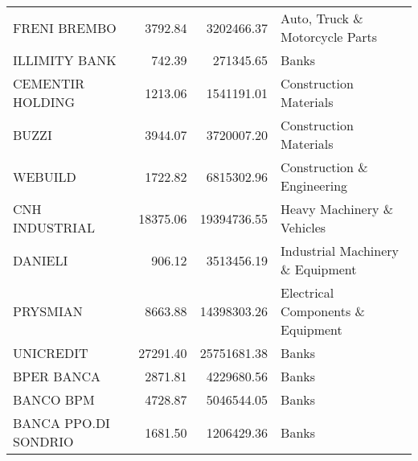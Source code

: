 \begin{tabular}{lrrl}
          FRENI BREMBO &     3792.84 &   3202466.37 &                     Auto, Truck \& Motorcycle Parts \\
         ILLIMITY BANK &      742.39 &    271345.65 &                                              Banks \\
      CEMENTIR HOLDING &     1213.06 &   1541191.01 &                             Construction Materials \\
                 BUZZI &     3944.07 &   3720007.20 &                             Construction Materials \\
               WEBUILD &     1722.82 &   6815302.96 &                         Construction \& Engineering \\
        CNH INDUSTRIAL &    18375.06 &  19394736.55 &                         Heavy Machinery \& Vehicles \\
               DANIELI &      906.12 &   3513456.19 &                   Industrial Machinery \& Equipment \\
              PRYSMIAN &     8663.88 &  14398303.26 &                  Electrical Components \& Equipment \\
             UNICREDIT &    27291.40 &  25751681.38 &                                              Banks \\
            BPER BANCA &     2871.81 &   4229680.56 &                                              Banks \\
             BANCO BPM &     4728.87 &   5046544.05 &                                              Banks \\
  BANCA PPO.DI SONDRIO &     1681.50 &   1206429.36 &                                              Banks \\
\bottomrule
\end{tabular}
